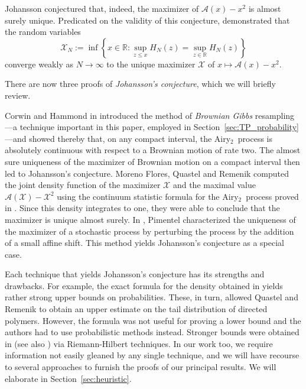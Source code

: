 \documentclass[oneside,final,11pt]{amsart}
\theoremstyle{definition}
\newcommand{\Airy}{Airy$_2$~}
\newcommand{\R}{\mathbb{R}}
\newcommand{\CX}{\mathcal{X}}
\newcommand{\1}[1]{\mathbf{1}_{#1}}
\newcommand{\CA}{\mathcal{A}}
\numberwithin{equation}{section}
\begin{document}
Johansson conjectured \cite[Conjecture 1.5]{JohanssonPoly} that, indeed, the maximizer of $\CA(x) - x^2$ is almost surely unique. Predicated on the validity of this conjecture, \cite[Theorem 1.6]{JohanssonPoly} demonstrated that the random variables
\begin{equation}
\CX_N := \inf \left\{x \in \R : \sup_{z \leq x} H_N(z) = \sup_{z \in \R} H_N(z)\right\}
\end{equation}
converge weakly as $N \to \infty$ to the unique maximizer $\CX$ of $x \mapsto \CA(x) - x^2$.

\smallskip
There are now three proofs of {\em Johansson's conjecture}, which we will briefly review.

\smallskip
Corwin and Hammond in \cite{BrownianGibbs} introduced the method of {\em Brownian Gibbs} resampling---a technique important in this paper, employed in Section~\ref{sec:TP_probability}---and showed thereby that, on any compact interval, the \Airy process is absolutely continuous with respect to a Brownian motion of rate two.  The almost sure uniqueness of the maximizer of Brownian motion on a compact interval then led to Johansson's conjecture.
%
Moreno Flores, Quastel and Remenik \cite{MaxOfAiry2} computed the joint density function of the maximizer $\CX$ and the maximal value $\CA(\CX) - \CX^2$ using the continuum statistic formula for the \Airy process proved in \cite{cqr}. Since this density integrates to one, they were able to conclude that the maximizer is unique almost surely.
%
In \cite{pimentel_2014}, Pimentel characterized the uniqueness of the maximizer of a stochastic process by perturbing the process by the addition of a small affine shift. This method yields Johansson's conjecture as a special case.

Each technique that yields Johansson's conjecture has its strengths and drawbacks. For example, the exact formula for the density obtained in \cite{MaxOfAiry2} yields rather strong upper bounds on probabilities. These, in turn, allowed Quastel and Remenik \cite{MR3300961} to obtain an upper estimate on the tail distribution of directed polymers. However, the formula was not useful for proving a lower bound and the authors had to use probabilistic methods instead. Stronger bounds were obtained in \cite{Schehr} (see also \cite{BLS}) via Riemann-Hilbert techniques. In our work too, we require information not easily gleaned by any single technique, and we will have recourse to several approaches to furnish the proofs of our principal results. We will elaborate  in Section~\ref{sec:heuristic}.
\end{document}

